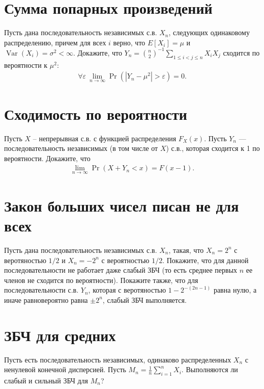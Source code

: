 \documentclass[12pt]{article}
\newcommand\eps{\varepsilon}
\DeclareMathOperator{\Var}{Var}
\begin{document}
\section{Сумма попарных произведений}
Пусть дана последовательность независимых с.в. $X_n$, следующих одинаковому распределению, причем для всех $i$ верно, что $E[X_i] = \mu$ и $\Var(X_i) = \sigma^2 < \infty$.
Докажите, что $Y_n = \binom{n}{2}^{-1} \sum_{1 \le i < j \le n} X_i X_j$ сходится по вероятности к $\mu^2$:
\begin{align*}
    \forall \eps \ \lim_{n \to \infty} \Pr(|Y_n - \mu^2| > \eps) = 0.
\end{align*}

\section{Сходимость по вероятности}

Пусть $X$ -- непрерывная с.в. с функцией распределения $F_X(x)$. Пусть $Y_n$ --- последовательность независимых (в том числе от $X$) с.в., которая сходится к 1 по вероятности. Докажите, что
\begin{align*}
    \lim_{n \to \infty}\Pr(X + Y_n < x) = F(x - 1).
\end{align*}

\section{Закон больших чисел писан не для всех}

Пусть дана последовательность независимых с.в. $X_n$, такая, что $X_n = 2^n$ с веротяностью $1/2$ и $X_n = - 2^n$ с вероятностью $1/2$. Покажите, что для данной последовательности не работает даже слабый ЗБЧ (то есть среднее первых $n$ ее членов не сходится по вероятности). Покажите также, что для последовательности с.в. $Y_n$, которая с веротяностью $1 - 2^{-(2n - 1)}$ равна нулю, а иначе равновероятно равна $\pm 2^n$, слабый ЗБЧ выполняется.

\section{ЗБЧ для средних}

Пусть есть последовательность независимых, одинаково распределенных $X_n$ с ненулевой конечной дисперсией. Пусть $M_n = \frac{1}{n}\sum_{i = 1}^n X_i$. Выполняются ли слабый и сильный ЗБЧ для $M_n$? 
\end{document}
